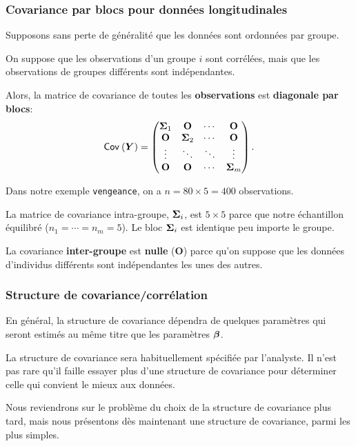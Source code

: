 \documentclass{beamer}
\begin{document}
\begin{frame}
\frametitle{Covariance par blocs pour données longitudinales}
\bi 
 \item 
 Supposons sans perte de généralité que les données sont ordonnées par groupe. 
 \item On suppose que les observations d'un groupe $i$ sont corrélées, mais que les observations de groupes différents sont indépendantes.

 \item Alors, la matrice de covariance de toutes les  \textbf{observations} est \textbf{diagonale par blocs}:
 \begin{align*}
  {\mathsf{Cov}_{}}\left(\boldsymbol {Y}\right) = \begin{pmatrix}
                 \boldsymbol {\Sigma}_1 & \mathbf{O} & \cdots & \mathbf{O}\\
                  \mathbf{O} &\boldsymbol {\Sigma}_2 & \cdots & \mathbf{O} \\
                  \vdots & \ddots & \ddots & \vdots \\
                   \mathbf{O} & \mathbf{O} & \cdots & \boldsymbol {\Sigma}_m 
                \end{pmatrix}.
\end{align*}
\bi 
\item Dans notre exemple \texttt{vengeance}, on a $n=80 \times 5 = 400$ observations.
\item La matrice de covariance \alert{intra-groupe}, $\boldsymbol {\Sigma}_i$, est $5 \times 5$ parce que notre échantillon équilibré ($n_1 = \cdots = n_m=5$). Le bloc $\boldsymbol {\Sigma}_i$ est identique peu importe le groupe.
\item La covariance \textbf{inter-groupe} est \textbf{nulle} ($\mathbf{O}$) parce qu'on suppose que les données d'individus différents sont indépendantes les unes des autres.
\ei
\ei
\end{frame}



\begin{frame}
\frametitle{Structure de covariance/corrélation}
\bi
\item En général, la structure de covariance dépendra de quelques paramètres qui
seront estimés au même titre que les paramètres $\boldsymbol {\beta}$. 
\item La structure de
covariance sera habituellement spécifiée par l'analyste. Il n'est pas rare qu'il
faille essayer plus d'une structure de covariance pour déterminer celle qui
convient le mieux aux données. 
\item Nous reviendrons sur le problème du choix de
la structure de covariance plus tard, mais nous présentons dès maintenant une
structure de covariance, parmi les plus simples. 
\ei
\end{frame}
\end{document}
